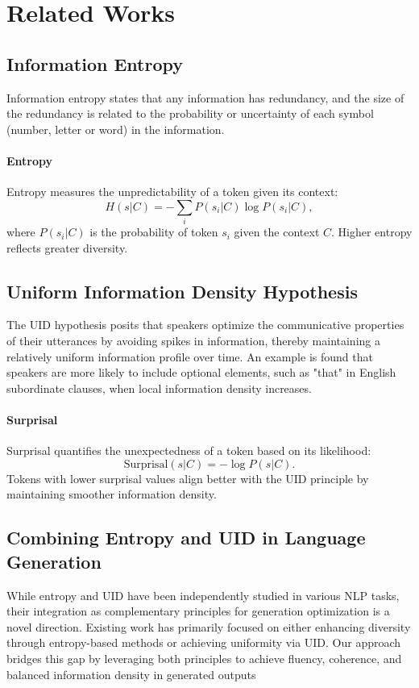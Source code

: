 \section{Related Works}
\subsection{Information Entropy}

Information entropy\cite{shannon} states that any information has redundancy, and the size of the redundancy is related to the probability or uncertainty of each symbol (number, letter or word) in the information. 

\paragraph{Entropy}
Entropy measures the unpredictability of a token given its context:
\[
H(s|C) = - \sum_{i} P(s_i|C) \log P(s_i|C),
\]
where \( P(s_i|C) \) is the probability of token \( s_i \) given the context \( C \). Higher entropy reflects greater diversity.

\subsection{Uniform Information Density Hypothesis}

The UID hypothesis posits that speakers optimize the communicative properties of their utterances by avoiding spikes in information, thereby maintaining a relatively uniform information profile over time. An example is \citet{FLORIANJAEGER201023} found that speakers are more likely to include optional elements, such as "that" in English subordinate clauses, when local information density increases. 

\paragraph{Surprisal}
Surprisal quantifies the unexpectedness of a token based on its likelihood:
\[
\text{Surprisal}(s|C) = -\log P(s|C).
\]
Tokens with lower surprisal values align better with the UID principle by maintaining smoother information density.

\subsection{Combining Entropy and UID in Language Generation}

While entropy and UID have been independently studied in various NLP tasks, their integration as complementary principles for generation optimization is a novel direction. Existing work has primarily focused on either enhancing diversity through entropy-based methods or achieving uniformity via UID. Our approach bridges this gap by leveraging both principles to achieve fluency, coherence, and balanced information density in generated outputs